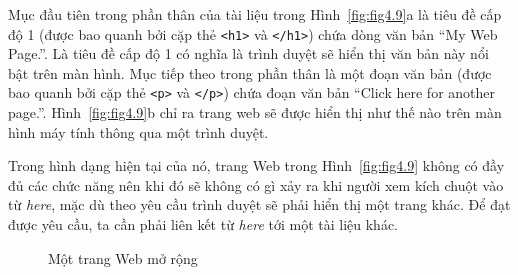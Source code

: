 Mục đầu tiên trong phần thân của tài liệu trong Hình~\ref{fig:fig4.9}a là tiêu đề cấp độ 1
(được bao quanh bởi cặp thẻ \texttt{<h1>} và \texttt{</h1>}) chứa dòng văn bản ``My Web
Page.''. Là tiêu đề cấp độ 1 có nghĩa là trình duyệt sẽ hiển thị văn bản này nổi bật trên
màn hình. Mục tiếp theo trong phần thân là một đoạn văn bản (được bao quanh bởi cặp thẻ
\texttt{<p>} và \texttt{</p>}) chứa đoạn văn bản ``Click here for another
page.''. Hình~\ref{fig:fig4.9}b chỉ ra trang web sẽ được hiển thị như thế nào trên màn
hình máy tính thông qua một trình duyệt.

Trong hình dạng hiện tại của nó, trang Web trong Hình~\ref{fig:fig4.9} không có đầy đủ các
chức năng nên khi đó sẽ không có gì xảy ra khi người xem kích chuột vào từ \textit{here},
 mặc dù theo yêu cầu trình duyệt sẽ phải hiển thị một trang khác. Để đạt được yêu cầu, ta cần phải liên kết từ \textit{here} tới một tài liệu khác.

\begin{figure}
  \centering {}
  \caption{Một trang Web mở rộng}
  \label{fig:fig4.10}
\end{figure}

